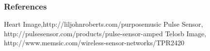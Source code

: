 \documentclass{beamer}
\begin{document}
\begin{frame}
\frametitle{References}
\footnotesize{
\begin{thebibliography}{99} %
 Heart Image,http://liljohnroberts.com/purposemusic
 Pulse Sensor,  http://pulsesensor.com/products/pulse-sensor-amped
 Telosb Image, http://www.memsic.com/wireless-sensor-networks/TPR2420
\end{thebibliography}
}
\end{frame}
\end{document}
